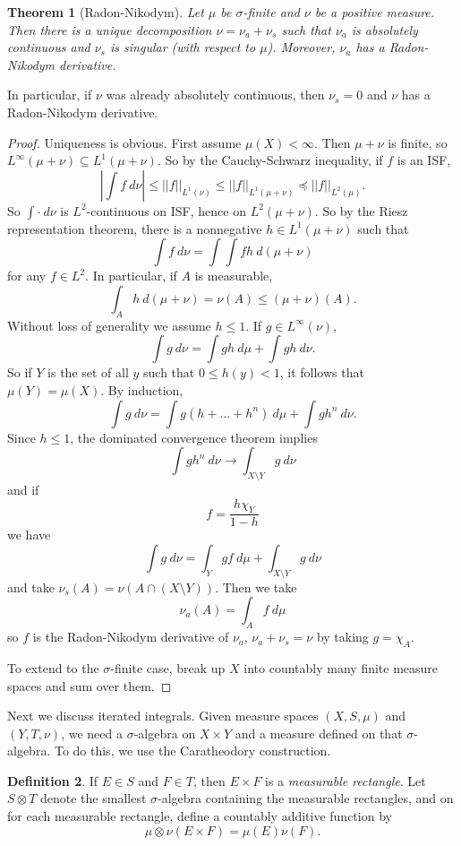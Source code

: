 \documentclass[12pt]{report}
\newcommand{\dfn}[1]{\emph{#1}\index{#1}}
\newtheorem{theorem}{Theorem}[chapter]
\theoremstyle{definition}
\newtheorem{definition}[theorem]{Definition}
\begin{document}
\begin{theorem}[Radon-Nikodym]
    Let $\mu$ be $\sigma$-finite and $\nu$ be a positive measure. Then there is a unique decomposition $\nu = \nu_a + \nu_s$ such that $\nu_a$ is absolutely continuous and $\nu_s$ is singular (with respect to $\mu$). Moreover, $\nu_a$ has a Radon-Nikodym derivative.
\end{theorem}
    In particular, if $\nu$ was already absolutely continuous, then $\nu_s = 0$ and $\nu$ has a Radon-Nikodym derivative.
\begin{proof}
    Uniqueness is obvious. First assume $\mu(X) < \infty$. Then $\mu + \nu$ is finite, so $L^\infty(\mu + \nu) \subseteq L^1(\mu + \nu)$. So by the Cauchy-Schwarz inequality, if $f$ is an ISF,
    $$\left|\int f ~d\nu\right| \leq ||f||_{L^1(\nu)} \leq ||f||_{L^1(\mu+\nu)} \preceq ||f||_{L^2(\mu)}.$$
    So $\int \cdot ~d\nu$ is $L^2$-continuous on ISF, hence on $L^2(\mu + \nu)$. So by the Riesz representation theorem, there is a nonnegative $h \in L^1(\mu + \nu)$ such that
    $$\int f ~d\nu = \int \int fh ~d(\mu + \nu)$$
    for any $f \in L^2$. In particular, if $A$ is measurable,
    $$\int_A h ~d(\mu + \nu) = \nu(A) \leq (\mu + \nu)(A).$$
    Without loss of generality we assume $h \leq 1$. If $g \in L^\infty(\nu)$,
    $$\int g ~d\nu = \int gh ~d\mu + \int gh ~d\nu.$$
    So if $Y$ is the set of all $y$ such that $0 \leq h(y) < 1$, it follows that $\mu(Y) = \mu(X)$. By induction,
    $$\int g ~d\nu = \int g(h + \dots + h^n) ~d\mu + \int gh^n ~d\nu.$$
    Since $h \leq 1$, the dominated convergence theorem implies
    $$\int gh^n ~d\nu \to \int_{X \setminus Y} g ~d\nu$$
    and if
    $$f = \frac{h\chi_Y}{1-h}$$
    we have
    $$\int g ~d\nu = \int_Y gf ~d\mu + \int_{X \setminus Y} g ~d\nu$$
    and take $\nu_s(A) = \nu(A \cap (X \setminus Y))$. Then we take
    $$\nu_a(A) = \int_A f ~d\mu$$
    so $f$ is the Radon-Nikodym derivative of $\nu_a$, $\nu_a + \nu_s = \nu$ by taking $g = \chi_A$.
    
    To extend to the $\sigma$-finite case, break up $X$ into countably many finite measure spaces and sum over them.
\end{proof}
    Next we discuss iterated integrals. Given measure spaces $(X, S, \mu)$ and $(Y, T, \nu)$, we need a $\sigma$-algebra on $X \times Y$ and a measure defined on that $\sigma$-algebra. To do this, we use the Caratheodory construction.
\begin{definition}
    If $E \in S$ and $F \in T$, then $E \times F$ is a \dfn{measurable rectangle}. Let $S \otimes T$ denote the smallest $\sigma$-algebra containing the measurable rectangles, and on for each measurable rectangle, define a countably additive function by
    $$\mu \otimes \nu(E \times F) = \mu(E) \nu(F).$$
\end{definition}
\end{document}
